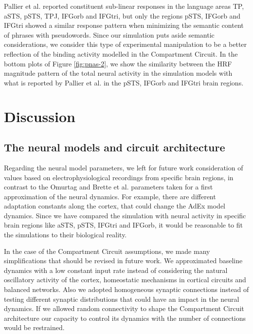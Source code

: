 \documentclass[10pt]{article}
\begin{document}
Pallier et al. reported constituent sub-linear responses in the language areas TP, aSTS, pSTS, TPJ, IFGorb and IFGtri, but only the regions pSTS, IFGorb and IFGtri showed a similar response pattern when minimizing the semantic content of phrases with pseudowords.
Since our simulation puts aside semantic considerations, we consider this type of experimental manipulation to be a better reflection of the binding activity modelled in the Compartment Circuit.
In the bottom plots of Figure \ref{fig:pnas-2}, we show the similarity between the HRF magnitude pattern of the total neural activity in the simulation models with what is reported by Pallier et al. in the pSTS, IFGorb and IFGtri brain regions.


\section{Discussion}
{\label{sec:discussion}}


\subsection{The neural models and circuit architecture}

Regarding the neural model parameters, we left for future work consideration of values based on electrophysiological recordings from specific brain regions, in contrast to the Omurtag\cite{omurtag2000simulation} and Brette et al. parameters \cite{Brette_2005} taken for a first approximation of the neural dynamics.
For example, there are different adaptation constants along the cortex, that could change the AdEx model dynamics.
Since we have compared the simulation with neural activity in specific brain regions like aSTS, pSTS, IFGtri and IFGorb, it would be reasonable to fit the simulations to their biological reality.

In the case of the Compartment Circuit assumptions, we made many simplifications that should be revised in future work.
We approximated baseline dynamics with a low constant input rate instead of considering the natural oscillatory activity of the cortex, homeostatic mechanisms in cortical circuits\cite{turrigiano2011too} and balanced networks\cite{Wolf_2014}.
Also we adopted homogeneous synaptic connections instead of testing different synaptic distributions that could have an impact in the neural dynamics.
If we allowed random connectivity to shape the Compartment Circuit architecture our capacity to control its dynamics with the number of connections would be restrained.
\end{document}
